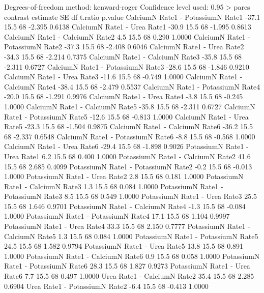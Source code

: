 \documentclass[a4paper,12pt]{article}
\begin{document}
\begin{enumerate}[label=\textbf{\alph*})]
\begin{MyVerbatim}
Degrees-of-freedom method: kenward-roger 
Confidence level used: 0.95
> pares
 contrast                              estimate SE  df t.ratio p.value
CalciumN   Rate1 - PotassiumN Rate1      -37.1 15.5 68  -2.395  0.6138
CalciumN   Rate1 - Urea Rate1            -30.9 15.5 68  -1.995  0.8613
CalciumN   Rate1 - CalciumN Rate2          4.5 15.5 68   0.290  1.0000
CalciumN   Rate1 - PotassiumN Rate2      -37.3 15.5 68  -2.408  0.6046
CalciumN   Rate1 - Urea Rate2            -34.3 15.5 68  -2.214  0.7375
CalciumN   Rate1 - CalciumN Rate3        -35.8 15.5 68  -2.311  0.6727
CalciumN   Rate1 - PotassiumN Rate3      -28.6 15.5 68  -1.846  0.9210
CalciumN   Rate1 - Urea Rate3            -11.6 15.5 68  -0.749  1.0000
CalciumN   Rate1 - CalciumN Rate4        -38.4 15.5 68  -2.479  0.5537
CalciumN   Rate1 - PotassiumN Rate4      -20.0 15.5 68  -1.291  0.9976
CalciumN   Rate1 - Urea Rate4             -3.8 15.5 68  -0.245  1.0000
CalciumN   Rate1 - CalciumN Rate5        -35.8 15.5 68  -2.311  0.6727
CalciumN   Rate1 - PotassiumN Rate5      -12.6 15.5 68  -0.813  1.0000
CalciumN   Rate1 - Urea Rate5            -23.3 15.5 68  -1.504  0.9875
CalciumN   Rate1 - CalciumN Rate6        -36.2 15.5 68  -2.337  0.6548
CalciumN   Rate1 - PotassiumN Rate6       -8.8 15.5 68  -0.568  1.0000
CalciumN   Rate1 - Urea Rate6            -29.4 15.5 68  -1.898  0.9026
PotassiumN Rate1 - Urea Rate1              6.2 15.5 68   0.400  1.0000
PotassiumN Rate1 - CalciumN Rate2         41.6 15.5 68   2.685  0.4099
PotassiumN Rate1 - PotassiumN Rate2       -0.2 15.5 68  -0.013  1.0000
PotassiumN Rate1 - Urea Rate2              2.8 15.5 68   0.181  1.0000
PotassiumN Rate1 - CalciumN Rate3          1.3 15.5 68   0.084  1.0000
PotassiumN Rate1 - PotassiumN Rate3        8.5 15.5 68   0.549  1.0000
PotassiumN Rate1 - Urea Rate3             25.5 15.5 68   1.646  0.9701
PotassiumN Rate1 - CalciumN Rate4         -1.3 15.5 68  -0.084  1.0000
PotassiumN Rate1 - PotassiumN Rate4       17.1 15.5 68   1.104  0.9997
PotassiumN Rate1 - Urea Rate4             33.3 15.5 68   2.150  0.7777
PotassiumN Rate1 - CalciumN Rate5          1.3 15.5 68   0.084  1.0000
PotassiumN Rate1 - PotassiumN Rate5       24.5 15.5 68   1.582  0.9794
PotassiumN Rate1 - Urea Rate5             13.8 15.5 68   0.891  1.0000
PotassiumN Rate1 - CalciumN Rate6          0.9 15.5 68   0.058  1.0000
PotassiumN Rate1 - PotassiumN Rate6       28.3 15.5 68   1.827  0.9273
PotassiumN Rate1 - Urea Rate6              7.7 15.5 68   0.497  1.0000
Urea       Rate1 - CalciumN Rate2         35.4 15.5 68   2.285  0.6904
Urea       Rate1 - PotassiumN Rate2       -6.4 15.5 68  -0.413  1.0000

\end{MyVerbatim}
\end{enumerate}
\end{document}
